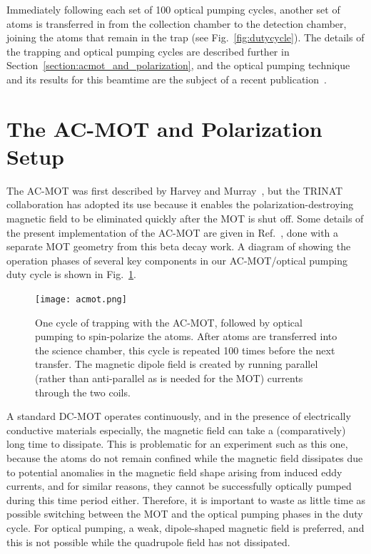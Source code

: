 Immediately following each set of 100 optical pumping cycles, another set of atoms is transferred in from the collection chamber to the detection chamber, joining the atoms that remain in the trap (see Fig.~\ref{fig:dutycycle}).  The details of the trapping and optical pumping cycles are described further in Section~\ref{section:acmot_and_polarization}, and the optical pumping technique and its results for this beamtime are the subject of a recent publication~\cite{ben_OP}.



\section{The AC-MOT and Polarization Setup}
\label{sec:acmot}
\label{section:acmot_and_polarization}



The AC-MOT was first described by Harvey and Murray~\cite{harveymurray}, but the TRINAT collaboration has adopted its use because it enables the polarization-destroying magnetic field to be eliminated quickly after the MOT is shut off.  Some details of the present implementation of the AC-MOT are given in Ref.~\cite{thesis}, done with a separate MOT geometry from this beta decay work.  A diagram of showing the operation phases of several key components in our AC-MOT/optical pumping duty cycle is shown in Fig.~\ref{fig:acmot}.

\begin{figure}[ht]
	\centering
		\texttt{[image: acmot.png]}
		\caption[The AC-MOT and Optical Pumping Cycle]{One cycle of trapping with the AC-MOT, followed by optical pumping to spin-polarize the atoms.  After atoms are transferred into the science chamber, this cycle is repeated 100 times before the next transfer.  The magnetic dipole field is created by running parallel (rather than anti-parallel as is needed for the MOT) currents through the two coils.}
		\label{fig:acmot}
\end{figure}

A standard DC-MOT operates continuously, and in the presence of electrically conductive materials especially, the magnetic field can take a (comparatively) long time to dissipate.  This is problematic for an experiment such as this one, because the atoms do not remain confined while the magnetic field dissipates due to potential anomalies in the magnetic field shape arising from induced eddy currents, and for similar reasons, they cannot be successfully optically pumped during this time period either.  Therefore, it is important to waste as little time as possible switching between the MOT and the  optical pumping phases in the duty cycle.  For optical pumping, a weak, dipole-shaped magnetic field is preferred, and this is not possible while the quadrupole field has not dissipated.

